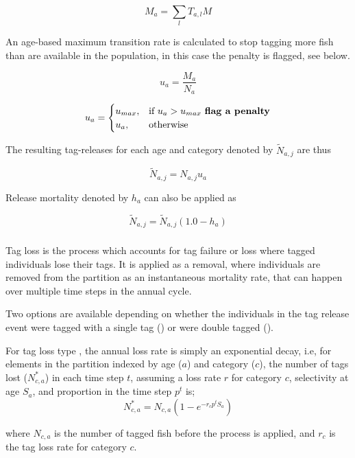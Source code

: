 $$ M_{a} = \sum_l T_{a,l}M  $$

An age-based maximum transition rate is calculated to stop tagging more fish than are available in the population, in this case the penalty is flagged, see below.

$$ u_{a} = \frac{ M_{a} }{ N_{a}}  $$

$$
u_{a} =
\begin{cases}
u_{max},& \text{if } u_{a} > u_{max} \text{ \textbf{flag a penalty}}\\
u_{a},  & \text{otherwise}
\end{cases}
$$

The resulting tag-releases for each age and category denoted by \(\widetilde{N}_{a,j}\) are thus

$$
\widetilde{N}_{a,j} = N_{a,j} u_{a}
$$

Release mortality denoted by \(h_a\) can also be applied as

$$\widetilde{N}_{a,j} = \widetilde{N}_{a,j}\left(1.0 - h_a\right)$$

\subsubsection{}\label{sec:Process-TagLoss} 

Tag loss is the process which accounts for tag failure or loss where tagged individuals lose their tags. It is applied as a removal, where individuals are removed from the partition as an instantaneous mortality rate, that can happen over multiple time steps in the annual cycle. 

Two options are available depending on whether the individuals in the tag release event were tagged with a single tag () or were double tagged ().

For tag loss type , the annual loss rate is simply an exponential decay, i.e, for elements in the partition indexed by age ($a$) and category ($c$), the number of tags lost ($N^*_{c,a}$) in each time step $t$, assuming a loss rate $r$ for category $c$, selectivity at age $S_a$, and proportion in the time step $p^t$ is; 
\begin{equation}
	N^*_{c,a} = N_{c,a} (1 -e^{-r_c p^t S_a})
\end{equation}

where $N_{c,a}$ is the number of tagged fish before the process is applied, and $r_c$ is the tag loss rate for category $c$.


